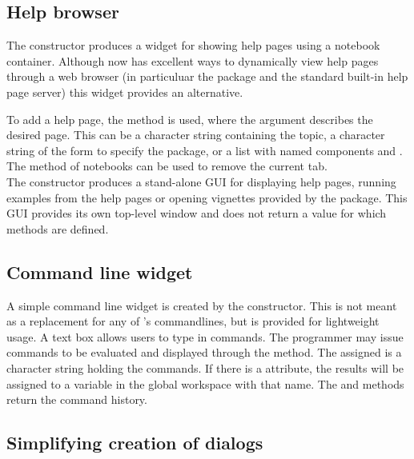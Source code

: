 \subsection{Help browser}
\label{sec:gWidgets-help-browser}

The  constructor produces a widget for showing help
pages using a notebook container. Although \R\/ now has excellent
ways to dynamically view help pages through a web browser (in
particuluar the  package and the standard built-in help
page server) this widget provides an alternative.

To add a help page, the  method is used,
where the  argument describes the desired page. This can
be a character string containing the topic, a character string of the
form  to specify the package, or a list with
named components  and .  The
 method of notebooks can be used to remove the
current tab.
\\

The  constructor produces a stand-alone
GUI for displaying help pages, running examples from the help pages or
opening vignettes provided by the package. This GUI provides its own
top-level window and does not return a value for which methods are defined.



\subsection{Command line widget}
\label{sec:gWidgets-command-line-widget}



A simple command line widget is created by the
 constructor. This is not meant as a
replacement for any of \R's commandlines, but is provided for
lightweight usage. A text box allows users to type in \R\/
commands. The programmer may issue commands to be evaluated and
displayed through the  method. The
 assigned is a character string holding the commands. If
there is a  attribute, the results will be assigned to a variable
in the global workspace with that name. The  and \code{[}
methods return the command history.

\subsection{Simplifying creation of dialogs}
\label{sec:gWidgets-designing-forms}

